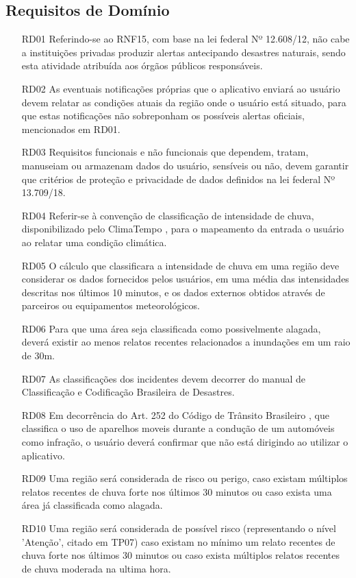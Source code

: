 \documentclass[12pt]{article}
\begin{document}
\subsection{Requisitos de Domínio}
\label{subsec:RequisitosDominio}
\begin{enumerate}
    \item [RD01] Referindo-se ao RNF15, com base na lei federal Nº 12.608/12\cite{PNPDEC}, não cabe a instituições privadas produzir alertas antecipando desastres naturais, sendo esta atividade atribuída aos órgãos públicos responsáveis.
    \item [RD02] As eventuais notificações próprias que o aplicativo enviará ao usuário devem relatar as condições atuais da região onde o usuário está situado, para que estas notificações não sobreponham os possíveis alertas oficiais, mencionados em RD01.
    \item [RD03] Requisitos funcionais e não funcionais que dependem, tratam, manuseiam ou armazenam dados do usuário, sensíveis ou não, devem garantir que critérios de proteção e privacidade de dados definidos na lei federal Nº 13.709/18. \cite{PrivDados}
    \item [RD04] Referir-se à convenção de classificação de intensidade de chuva, disponibilizado pelo ClimaTempo \cite{ClimaTempo}, para o mapeamento da entrada o usuário ao relatar uma condição climática.
    \item [RD05] O cálculo que classificara a intensidade de chuva em uma região deve considerar os dados fornecidos pelos usuários, em uma média das intensidades descritas nos últimos 10 minutos, e os dados externos obtidos através de parceiros ou equipamentos meteorológicos.%
    \item [RD06] Para que uma área seja classificada como possivelmente alagada, deverá existir ao menos relatos recentes relacionados a inundações em um raio de 30m.%
    \item [RD07] As classificações dos incidentes devem decorrer do manual de Classificação e Codificação Brasileira de Desastres. \cite{COBRADE}
    \item [RD08] Em decorrência do Art. 252 do Código de Trânsito Brasileiro \cite{transito}, que classifica o uso de aparelhos moveis durante a condução de um automóveis como infração, o usuário deverá confirmar que não está dirigindo ao utilizar o aplicativo.
    \item [RD09] Uma região será considerada de risco ou perigo, caso existam múltiplos relatos recentes de chuva forte nos últimos 30 minutos ou caso exista uma área já classificada como alagada.
    \item [RD10] Uma região será considerada de possível risco (representando o nível 'Atenção', citado em TP07) caso existam no mínimo um relato recentes de chuva forte nos últimos 30 minutos ou caso exista múltiplos relatos recentes de chuva moderada na ultima hora.
\end{enumerate}
\end{document}
